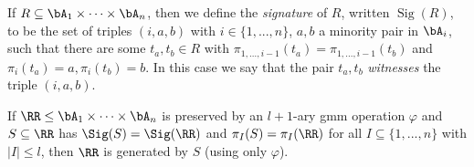 \begin{defn} If $R \subseteq \bA_1 \times \cdots \times \bA_n$, then we define the \emph{signature} of $R$, written $\operatorname{Sig}(R)$, to be the set of triples $(i,a,b)$ with $i \in \{1, ..., n\}$, $a,b$ a minority pair in $\bA_i$, such that there are some $t_a,t_b \in R$ with $\pi_{1, ..., i-1}(t_a) = \pi_{1, ..., i-1}(t_b)$ and $\pi_i(t_a) = a, \pi_i(t_b) = b$. In this case we say that the pair $t_a,t_b$ \emph{witnesses} the triple $(i,a,b)$.
\end{defn}

\begin{thm}\label{gmm-compact} If $\RR \le \bA_1 \times \cdots \times \bA_n$ is preserved by an $l+1$-ary gmm operation $\varphi$ and $S \subseteq \RR$ has $\Sig(S) = \Sig(\RR)$ and $\pi_I(S) = \pi_I(\RR)$ for all $I \subseteq \{1, ..., n\}$ with $|I| \le l$, then $\RR$ is generated by $S$ (using only $\varphi$).
\end{thm}
